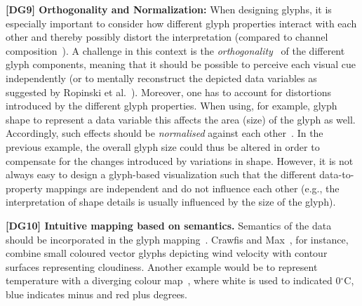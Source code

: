 \textbf{[DG9] Orthogonality and Normalization:}
When designing glyphs, it is especially important to consider how different glyph properties interact with each other and thereby possibly distort the interpretation (compared to channel composition~\cite{Maguire:2012:TVCG}).
A challenge in this context is the \emph{orthogonality}~\cite{lie09glyphs} of the different glyph components, meaning that it should be possible to perceive each visual cue independently (or to mentally reconstruct the depicted data variables as suggested by Ropinski et al.~\cite{Ropinski11glyphs}).
Moreover, one has to account for %
distortions introduced by the different glyph properties. When using, for example, glyph shape to represent a data variable this affects the area (size) of the glyph as well.
Accordingly, such effects should be \emph{normalised} against each other~\cite{lie09glyphs}. 
In the previous example, the overall glyph size could thus be altered in order to compensate for the changes introduced by variations in shape.
However, it is not always easy to design a glyph-based visualization such that the different data-to-property mappings are independent and do not influence each other (e.g., the interpretation of shape details is usually influenced by the size of the glyph).


\textbf{[DG10] Intuitive mapping based on semantics.}
Semantics of the data should be incorporated in the glyph mapping~\cite{ward08glyphs, lie09glyphs, Ropinski11glyphs,Maguire:2012:TVCG}.
Crawfis and Max~\cite{crawfisMax93textureSplats}, for instance, combine small coloured vector glyphs depicting wind velocity with contour surfaces representing cloudiness.
Another example would be to represent temperature with a diverging colour map~\cite{brewer99colorGuidelines}, where white is used to indicated 0$^\circ$C, blue indicates minus and red plus degrees.

